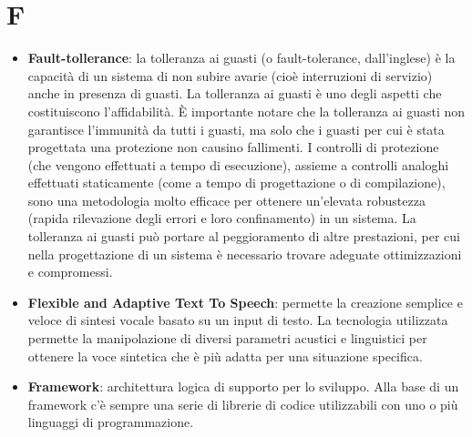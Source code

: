 \section{F}
\begin{itemize} 
	\item
	\textbf{Fault-tollerance}: la tolleranza ai guasti (o fault-tolerance, dall'inglese) è la capacità di un sistema di non subire avarie (cioè interruzioni di servizio) anche in presenza di guasti. La tolleranza ai guasti è uno degli aspetti che costituiscono l'affidabilità. È importante notare che la tolleranza ai guasti non garantisce l'immunità da tutti i guasti, ma solo che i guasti per cui è stata progettata una protezione non causino fallimenti.
	I controlli di protezione (che vengono effettuati a tempo di esecuzione), assieme a controlli analoghi effettuati staticamente (come a tempo di progettazione o di compilazione), sono una metodologia molto efficace per ottenere un'elevata robustezza (rapida rilevazione degli errori e loro confinamento) in un sistema.
	La tolleranza ai guasti può portare al peggioramento di altre prestazioni, per cui nella progettazione di un sistema è necessario trovare adeguate ottimizzazioni e compromessi.
	\item
	\textbf{Flexible and Adaptive Text To Speech}: permette la creazione semplice e veloce di sintesi vocale basato su un input di testo. La tecnologia utilizzata permette la manipolazione di diversi parametri acustici e linguistici per ottenere la voce sintetica che è più adatta per una situazione specifica. 
	\item
	\textbf{Framework}: architettura logica di supporto per lo sviluppo. Alla base di un framework c’è sempre una serie di librerie di codice utilizzabili con uno o più linguaggi di programmazione.
\end{itemize}
